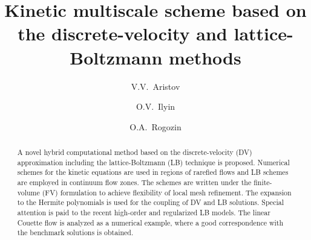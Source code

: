 \documentclass{elsarticle} %
\begin{document}
\begin{frontmatter}

\title{Kinetic multiscale scheme based on the discrete-velocity and lattice-Boltzmann methods}

\author[ccas]{V.V.~Aristov}
\author[ccas]{O.V.~Ilyin}
\author[skoltech,ccas]{O.A.~Rogozin}

\address[ccas]{Dorodnicyn Computing Center,
    Federal Research Center "Computer Science and Control" of Russian Academy of Science, Moscow, Russia}
\address[skoltech]{Center for Design, Manufacturing, and Materials,
    Skolkovo Institute of Science and Technology, Moscow, Russia}

\begin{abstract}

A novel hybrid computational method based on the discrete-velocity (DV) approximation including the lattice-Boltzmann (LB) technique is proposed.
Numerical schemes for the kinetic equations are used in regions of rarefied flows and LB schemes are employed in continuum flow zones.
The schemes are written under the finite-volume (FV) formulation to achieve flexibility of local mesh refinement.
The expansion to the Hermite polynomials is used for the coupling of DV and LB solutions.
Special attention is paid to the recent high-order and regularized LB models.
The linear Couette flow is analyzed as a numerical example,
where a good correspondence with the benchmark solutions is obtained.







\end{abstract}
\end{frontmatter}
\end{document}
